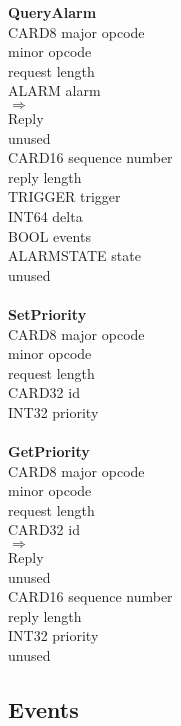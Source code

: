 \begin{tabbing}
\tabstopsC
{\bf QueryAlarm}\\
		\> CARD8	\> major opcode \\
	\> 1			\> minor opcode\footnotemark[1] \\
	\> 2			\> request length \\
		\> ALARM	\> alarm \\
$\Rightarrow$\\
	\> 1			\> Reply \\
		\>		\> unused \\
		\> CARD16	\> sequence number \\
				\> reply length \\
		\> TRIGGER	\> trigger \\
		\> INT64	\> delta \\
		\> BOOL		\> events \\
		\> ALARMSTATE	\> state \\
		\>		\> unused \\
\\
{\bf SetPriority}\\
		\> CARD8	\> major opcode \\
	\> 1			\> minor opcode \\
				\> request length \\
		\> CARD32	\> id \\
		\> INT32	\> priority \\
\\
{\bf GetPriority}\\
		\> CARD8	\> major opcode \\
	\> 1			\> minor opcode \\
				\> request length \\
		\> CARD32	\> id \\
$\Rightarrow$\\
	\> 1			\> Reply \\
		\>		\> unused \\
		\> CARD16	\> sequence number \\
				\> reply length \\
		\> INT32	\> priority \\
		\>		\> unused\\
\end{tabbing}

\subsection*{Events}

